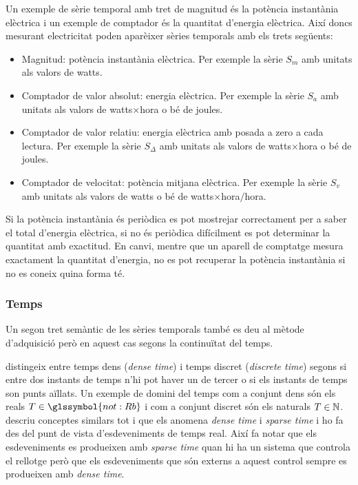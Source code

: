 
\begin{example}
  Un exemple de sèrie temporal amb tret de magnitud és la potència
  instantània elèctrica i un exemple de comptador és la quantitat
  d'energia elèctrica. Així doncs mesurant electricitat poden
  aparèixer sèries temporals amb els trets següents:

  \begin{itemize}
  \item Magnitud: potència instantània elèctrica.  Per exemple la
    sèrie $S_m$ amb unitats als valors de watts.
  \item Comptador de valor absolut: energia elèctrica. Per exemple la
    sèrie $S_a$ amb unitats als valors de watts$\times$hora o bé de
    joules.
  \item Comptador de valor relatiu: energia elèctrica amb posada a
    zero a cada lectura. Per exemple la sèrie $S_\Delta$ amb unitats
    als valors de watts$\times$hora o bé de joules.
  \item Comptador de velocitat: potència mitjana elèctrica. Per
    exemple la sèrie $S_v$ amb unitats als valors de watts o bé de
    watts$\times$hora$/$hora.
  \end{itemize}

  Si la potència instantània és periòdica es pot mostrejar
  correctament per a saber el total d'energia elèctrica, si no és
  periòdica difícilment es pot determinar la quantitat amb exactitud.
  En canvi, mentre que un aparell de comptatge mesura exactament la
  quantitat d'energia, no es pot recuperar la potència instantània si
  no es coneix quina forma té. 
\end{example}



\subsubsection{Temps}

Un segon tret semàntic de les sèries temporals també es deu al mètode
d'adquisició però en aquest cas segons la continuïtat del temps.

\textcite{furia10:modeling_time} distingeix entre temps dens
(\emph{dense time}) i temps discret (\emph{discrete time}) segons si
entre dos instants de temps n'hi pot haver un de tercer o si els
instants de temps son punts aïllats. Un exemple de domini del temps
com a conjunt dens són els reals $T\in \glssymbol{not:Rb}$ i com a
conjunt discret són els naturals $T\in \mathbb{N}$.
\textcite[cap.~3]{kopetz11:realtime} descriu conceptes similars tot i que els
anomena \emph{dense time} i \emph{sparse time} i ho fa des del punt de
vista d'esdeveniments de temps real. Així fa notar que els
esdeveniments es produeixen amb \emph{sparse time} quan hi ha un
sistema que controla el rellotge però que els esdeveniments que són
externs a aquest control sempre es produeixen amb \emph{dense time}.

